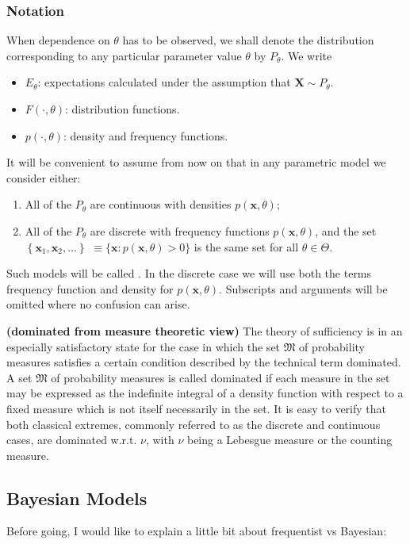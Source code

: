 \documentclass{article}
\newcommand{\bfs}[1]{\textbf{({#1}) }}
\begin{document}
\subsubsection{Notation}
When dependence on $\theta$ has to be observed, we shall denote the distribution corresponding to any particular parameter value $\theta$ by $P_{\theta}$.  We write
\begin{itemize}
    \item $E_{\theta}$: expectations calculated under the assumption that $\mathbf{X} \sim P_{\theta}$.
    \item $F(\cdot, \theta)$: distribution functions.
    \item $p(\cdot, \theta)$: density and frequency functions. 
\end{itemize}
It will be convenient to assume from now on that in any parametric model we consider either:
\begin{enumerate}
    \item All of the $P_{\theta}$ are continuous with densities $p(\mathbf{x}, \theta)$;
    \item  All of the $P_{\theta}$ are discrete with frequency functions $p(\mathbf{x}, \theta)$, and the set $\left\{\mathbf{x}_{1}, \mathbf{x}_{2}, \ldots\right\}$ $\equiv\{\mathbf{x}: p(\mathbf{x}, \theta)>0\}$ is the same set for all $\theta \in \Theta .$
\end{enumerate}

Such models will be called . In the discrete case we will use both the terms frequency function and density for $p(\mathbf{x}, \theta)$. Subscripts and arguments will be omitted where no confusion can arise.

\begin{rema}\bfs{dominated from measure theoretic view}
The theory of sufficiency is in an especially satisfactory state for the case in which the set $\mathfrak{M}$ of probability measures satisfies a certain condition described by the technical term dominated. A set $\mathfrak{M}$ of probability measures is called dominated if each measure in the set may be expressed as the indefinite integral of a density function with respect to a fixed measure which is not itself necessarily in the set. It is easy to verify that both classical extremes, commonly referred to as the discrete and continuous cases, are dominated w.r.t. $\nu$, with $\nu$ being a Lebesgue measure or the counting measure.
\end{rema}

\subsection{Bayesian Models}\label{sec:bayesian}
Before going, I would like to explain a little bit about frequentist vs Bayesian:
\end{document}
